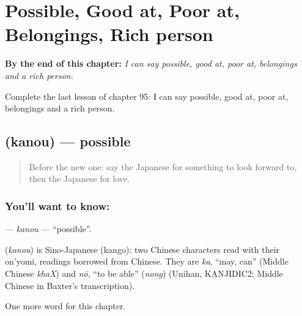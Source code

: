 
\chapter{Possible, Good at, Poor at, Belongings, Rich person}
\label{ch:ja-possible-good-at-poor-at-belongings-rich-person}

\begin{chapteropening}
\textbf{By the end of this chapter:} \emph{I can say possible, good at, poor at, belongings and a rich person.}

Complete the last lesson of chapter 95: I can say possible, good at, poor at, belongings and a rich person.
\end{chapteropening}

\section[\texorpdfstring{\ja{かのう} (kanou)}{かのう (kanou)}]{ (kanou) — possible}

\label{lesson:JA-C95-kanou}



\begin{quote}
Before the new one: say the Japanese for something to look forward to, then the Japanese for love.
\end{quote}

\subsection*{You'll want to know: }
\textbf{} — \emph{kanou} — \textquotedblleft{}possible\textquotedblright{}.

\begin{cousinweb}
\textbf{} (\emph{kanou}) is Sino-Japanese (kango): two Chinese characters read with their on'yomi, readings borrowed from Chinese. They are \emph{ka}, \textquotedblleft{}may, can\textquotedblright{} (Middle Chinese \emph{khaX}) and \emph{nō}, \textquotedblleft{}to be able\textquotedblright{} (\emph{nong}) (Unihan, KANJIDIC2; Middle Chinese in Baxter's transcription).
\end{cousinweb}

\begin{grammarlens}[title={What you've built}]
One more word for this chapter.
\end{grammarlens}

